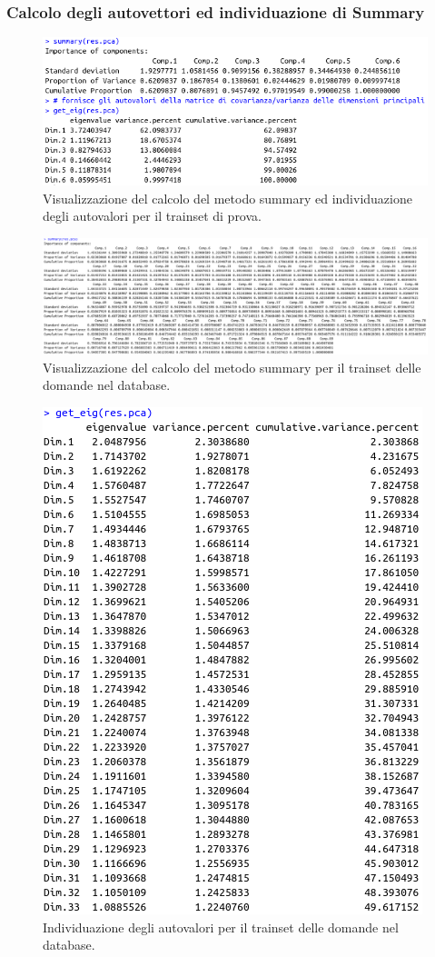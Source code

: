 \subsubsection{Calcolo degli autovettori ed individuazione di Summary}
\label{Calcolo degli autovettori ed individuazione di Summary}
\begin{figure}[H]
\centering
	\includegraphics[width=0.80\linewidth]{../../PCA/plot/summary-autovalore_rete-prova.png}
	\caption{Visualizzazione del calcolo del metodo summary ed individuazione degli autovalori per il trainset di prova.}
\end{figure}
\begin{figure}[H]
\centering
	\includegraphics[width=1\linewidth]{../../PCA/plot/summary_db.png}
	\caption{Visualizzazione del calcolo del metodo summary per il trainset delle domande nel database.}
\end{figure}
\begin{figure}[H]
\centering
	\includegraphics[width=0.60\linewidth]{../../PCA/plot/autovalori_db.png}
	\caption{Individuazione degli autovalori per il trainset delle domande nel database.}
\end{figure}

